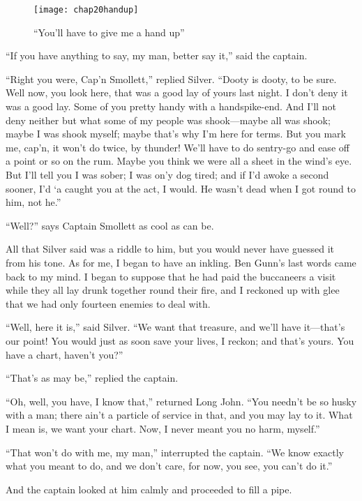   \begin{figure}[p]
\centering
\texttt{[image: chap20handup]}
\caption{\enquote{You’ll have to give me a hand up}}
\end{figure}  

\enquote{If you have anything to say, my man, better say it,} said the captain.

\enquote{Right you were, Cap’n Smollett,} replied Silver. \enquote{Dooty is dooty, to be sure. Well now, you look here, that was a good lay of yours last night. I don’t deny it was a good lay. Some of you pretty handy with a handspike-end. And I’ll not deny neither but what some of my people was shook---maybe all was shook; maybe I was shook myself; maybe that’s why I’m here for terms. But you mark me, cap’n, it won’t do twice, by thunder! We’ll have to do sentry-go and ease off a point or so on the rum. Maybe you think we were all a sheet in the wind’s eye. But I’ll tell you I was sober; I was on’y dog tired; and if I’d awoke a second sooner, I’d `a caught you at the act, I would. He wasn’t dead when I got round to him, not he.}

\enquote{Well?} says Captain Smollett as cool as can be.

All that Silver said was a riddle to him, but you would never have guessed it from his tone. As for me, I began to have an inkling. Ben Gunn’s last words came back to my mind. I began to suppose that he had paid the buccaneers a visit while they all lay drunk together round their fire, and I reckoned up with glee that we had only fourteen enemies to deal with.

\enquote{Well, here it is,} said Silver. \enquote{We want that treasure, and we’ll have it---that’s our point! You would just as soon save your lives, I reckon; and that’s yours. You have a chart, haven’t you?}

\enquote{That’s as may be,} replied the captain.

\enquote{Oh, well, you have, I know that,} returned Long John. \enquote{You needn’t be so husky with a man; there ain’t a particle of service in that, and you may lay to it. What I mean is, we want your chart. Now, I never meant you no harm, myself.}

\enquote{That won’t do with me, my man,} interrupted the captain. \enquote{We know exactly what you meant to do, and we don’t care, for now, you see, you can’t do it.}

And the captain looked at him calmly and proceeded to fill a pipe.

